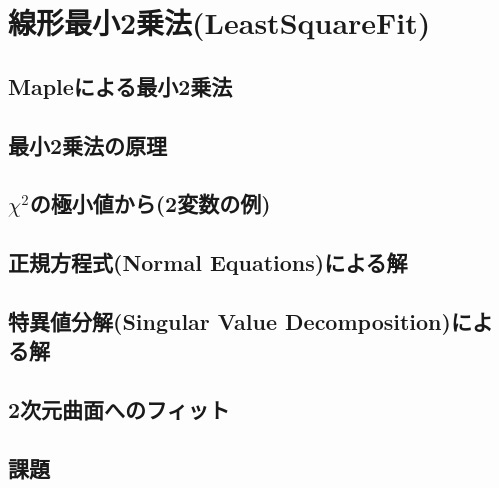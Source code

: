 \documentclass[10pt,a4j]{jreport}
\begin{document}
\chapter{線形最小2乗法(LeastSquareFit)}
\section{Mapleによる最小2乗法}

\section{最小2乗法の原理}

\section{$\chi^2$の極小値から(2変数の例)}

\section{正規方程式(Normal Equations)による解}

\section{特異値分解(Singular Value Decomposition)による解}

\section{2次元曲面へのフィット}

\section{課題}

\end{document}
